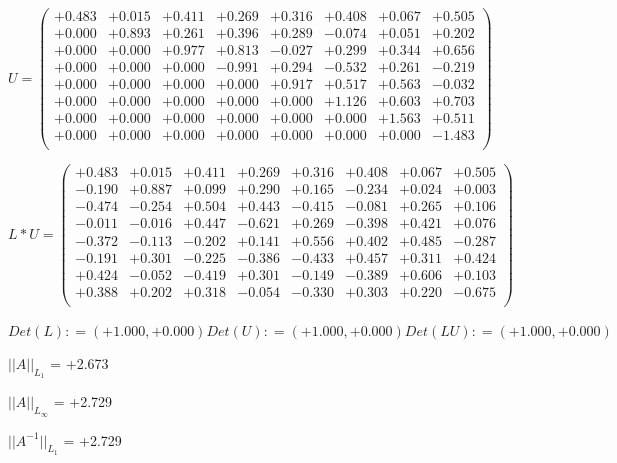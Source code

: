 \documentclass[9pt]{article}
\theoremstyle{plain}
\theoremstyle{definition}
\theoremstyle{remark}
\numberwithin{equation}{section}
\begin{document}
$U = \left(
\begin{array}{
cccccccc}
+0.483 & +0.015 & +0.411 & +0.269 & +0.316 & +0.408 & +0.067 & +0.505 \\
+0.000 & +0.893 & +0.261 & +0.396 & +0.289 & -0.074 & +0.051 & +0.202 \\
+0.000 & +0.000 & +0.977 & +0.813 & -0.027 & +0.299 & +0.344 & +0.656 \\
+0.000 & +0.000 & +0.000 & -0.991 & +0.294 & -0.532 & +0.261 & -0.219 \\
+0.000 & +0.000 & +0.000 & +0.000 & +0.917 & +0.517 & +0.563 & -0.032 \\
+0.000 & +0.000 & +0.000 & +0.000 & +0.000 & +1.126 & +0.603 & +0.703 \\
+0.000 & +0.000 & +0.000 & +0.000 & +0.000 & +0.000 & +1.563 & +0.511 \\
+0.000 & +0.000 & +0.000 & +0.000 & +0.000 & +0.000 & +0.000 & -1.483 \\
\end{array}
\right)$ \newline 

$L * U  = \left(
\begin{array}{
cccccccc}
+0.483 & +0.015 & +0.411 & +0.269 & +0.316 & +0.408 & +0.067 & +0.505 \\
-0.190 & +0.887 & +0.099 & +0.290 & +0.165 & -0.234 & +0.024 & +0.003 \\
-0.474 & -0.254 & +0.504 & +0.443 & -0.415 & -0.081 & +0.265 & +0.106 \\
-0.011 & -0.016 & +0.447 & -0.621 & +0.269 & -0.398 & +0.421 & +0.076 \\
-0.372 & -0.113 & -0.202 & +0.141 & +0.556 & +0.402 & +0.485 & -0.287 \\
-0.191 & +0.301 & -0.225 & -0.386 & -0.433 & +0.457 & +0.311 & +0.424 \\
+0.424 & -0.052 & -0.419 & +0.301 & -0.149 & -0.389 & +0.606 & +0.103 \\
+0.388 & +0.202 & +0.318 & -0.054 & -0.330 & +0.303 & +0.220 & -0.675 \\
\end{array}
\right)$ \newline 

$Det(L) :    = (+1.000,+0.000)     Det(U) :    = (+1.000,+0.000)     Det(LU) :    = (+1.000,+0.000)$

$||A||_{L_1}$  = +2.673

$||A||_{L_{\infty}}$ = +2.729

$||A^{-1}||_{L_1}$  = +2.729
\end{document}
